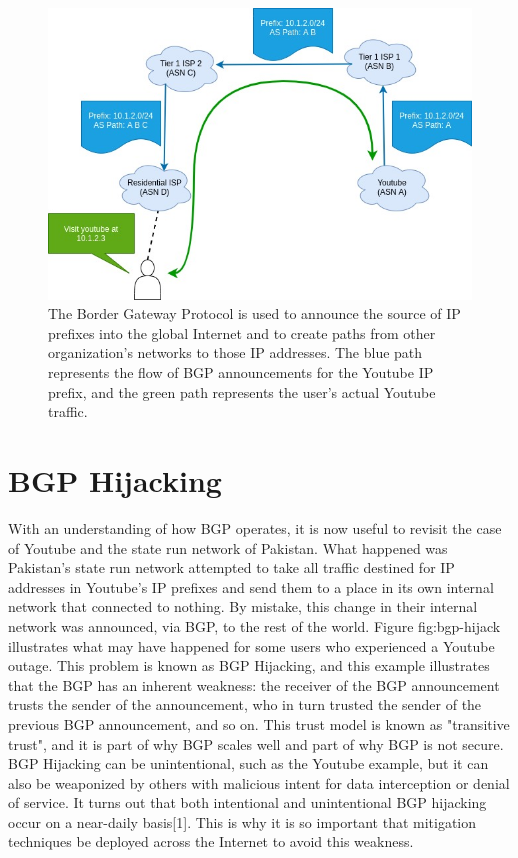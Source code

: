 \documentclass[conference]{IEEEtran}
\begin{document}
\begin{figure}
  \includegraphics[width=\linewidth]{images/bgp-ops.jpg}
  \caption{The Border Gateway Protocol is used to announce the source of IP prefixes into the global Internet and to create paths from other organization's networks to those IP addresses.  The blue path represents the flow of BGP announcements for the Youtube IP prefix, and the green path represents the user's actual Youtube traffic.}
  \label{fig:bgp-ops}
\end{figure}

\section{BGP Hijacking}
With an understanding of how BGP operates, it is now useful to revisit the case of Youtube and the state run network of Pakistan.  What happened was Pakistan's state run network attempted to take all traffic destined for IP addresses in Youtube's IP prefixes and send them to a place in its own internal network that connected to nothing.  By mistake, this change in their internal network was announced, via BGP, to the rest of the world.  Figure {fig:bgp-hijack} illustrates what may have happened for some users who experienced a Youtube outage.  This problem is known as BGP Hijacking, and this example illustrates that the BGP has an inherent weakness: the receiver of the BGP announcement trusts the sender of the announcement, who in turn trusted the sender of the previous BGP announcement, and so on.  This trust model is known as "transitive trust", and it is part of why BGP scales well and part of why BGP is not secure.  BGP Hijacking can be unintentional, such as the Youtube example, but it can also be weaponized by others with malicious intent for data interception or denial of service.  It turns out that both intentional and unintentional BGP hijacking occur on a near-daily basis[1].  This is why it is so important that mitigation techniques be deployed across the Internet to avoid this weakness.
\end{document}
